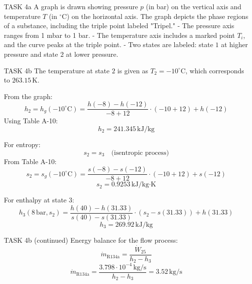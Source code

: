 TASK 4a  
A graph is drawn showing pressure \( p \) (in bar) on the vertical axis and temperature \( T \) (in \( ^\circ \text{C} \)) on the horizontal axis. The graph depicts the phase regions of a substance, including the triple point labeled "Tripel."  
- The pressure axis ranges from 1 mbar to 1 bar.  
- The temperature axis includes a marked point \( T_i \), and the curve peaks at the triple point.  
- Two states are labeled: state \( 1 \) at higher pressure and state \( 2 \) at lower pressure.  

TASK 4b  
The temperature at state \( 2 \) is given as \( T_2 = -10^\circ \text{C} \), which corresponds to \( 263.15 \, \text{K} \).  

From the graph:  
\[
h_2 = h_g(-10^\circ \text{C}) = \frac{h(-8) - h(-12)}{-8 + 12} \cdot (-10 + 12) + h(-12)
\]  
Using Table A-10:  
\[
h_2 = 241.345 \, \text{kJ/kg}
\]  

For entropy:  
\[
s_2 = s_3 \quad \text{(isentropic process)}  
\]  
From Table A-10:  
\[
s_2 = s_g(-10^\circ \text{C}) = \frac{s(-8) - s(-12)}{-8 + 12} \cdot (-10 + 12) + s(-12)
\]  
\[
s_2 = 0.9253 \, \text{kJ/kg·K}
\]  

For enthalpy at state \( 3 \):  
\[
h_3(8 \, \text{bar}, s_2) = \frac{h(40) - h(31.33)}{s(40) - s(31.33)} \cdot (s_2 - s(31.33)) + h(31.33)
\]  
\[
h_3 = 269.92 \, \text{kJ/kg}
\]  

TASK 4b (continued)  
Energy balance for the flow process:  
\[
\dot{m}_{\text{R134a}} = \frac{\dot{W}_{25}}{h_2 - h_3}
\]  
\[
\dot{m}_{\text{R134a}} = \frac{3.798 \cdot 10^{-4} \, \text{kg/s}}{h_2 - h_3} = 3.52 \, \text{kg/s}
\]